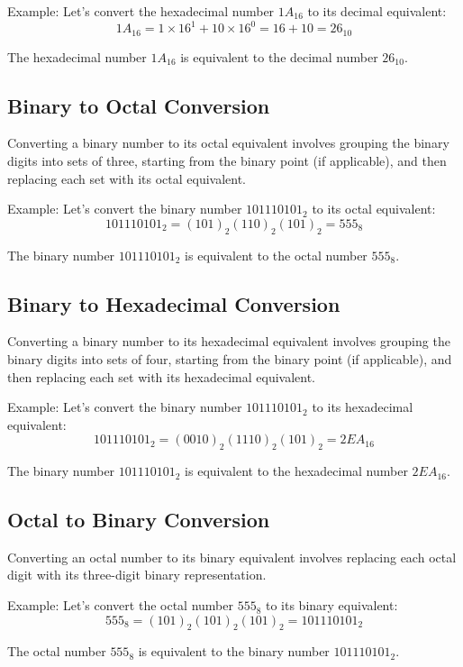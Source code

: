 \documentclass{article}
\begin{document}
Example: Let's convert the hexadecimal number $1A_{16}$ to its decimal equivalent:
\[ 1A_{16} = 1 \times 16^1 + 10 \times 16^0 = 16 + 10 = 26_{10} \]

The hexadecimal number $1A_{16}$ is equivalent to the decimal number $26_{10}$.

\subsection{Binary to Octal Conversion}

Converting a binary number to its octal equivalent involves grouping the binary digits into sets of three, starting from the binary point (if applicable), and then replacing each set with its octal equivalent.

Example: Let's convert the binary number $101110101_2$ to its octal equivalent:
\[ 101110101_2 = (101)_2 (110)_2 (101)_2 = 555_8 \]

The binary number $101110101_2$ is equivalent to the octal number $555_8$.

\subsection{Binary to Hexadecimal Conversion}

Converting a binary number to its hexadecimal equivalent involves grouping the binary digits into sets of four, starting from the binary point (if applicable), and then replacing each set with its hexadecimal equivalent.

Example: Let's convert the binary number $101110101_2$ to its hexadecimal equivalent:
\[ 101110101_2 = (0010)_2 (1110)_2 (101)_2 = 2EA_{16} \]

The binary number $101110101_2$ is equivalent to the hexadecimal number $2EA_{16}$.

\subsection{Octal to Binary Conversion}

Converting an octal number to its binary equivalent involves replacing each octal digit with its three-digit binary representation.

Example: Let's convert the octal number $555_8$ to its binary equivalent:
\[ 555_8 = (101)_2 (101)_2 (101)_2 = 101110101_2 \]

The octal number $555_8$ is equivalent to the binary number $101110101_2$.
\end{document}
